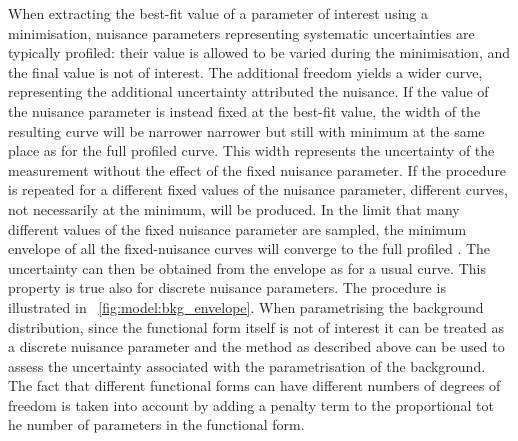 When extracting the best-fit value of a parameter of interest using a \NLL minimisation, nuisance parameters representing systematic uncertainties are typically profiled: their value is allowed to be varied during the minimisation, and the final value is not of interest. The additional freedom yields a wider \NLL curve, representing the additional uncertainty attributed the nuisance. 
If the value of the nuisance parameter is instead fixed at the best-fit value, the width of the resulting \NLL curve will be narrower narrower but still with minimum at the same place as for the full profiled \NLL curve. This width represents the uncertainty of the measurement without the effect of the fixed nuisance parameter. If the procedure is repeated for a different fixed values of the nuisance parameter, different \NLL curves, not necessarily at the minimum, will be produced. In the limit that many different values of the fixed nuisance parameter are sampled, the minimum envelope of all the fixed-nuisance \NLL curves will converge to the full profiled \NLL. The uncertainty can then be obtained from the envelope as for a usual \NLL curve. This property is true also for discrete nuisance parameters. The procedure is illustrated in \Fig~\ref{fig:model:bkg_envelope}. When parametrising the background distribution, since the functional form itself is not of interest it can be treated as a discrete nuisance parameter and the method as described above can be used to assess the uncertainty associated with the parametrisation of the background. The fact that different functional forms can have different numbers of degrees of freedom is taken into account by adding a penalty term to the \NLL proportional tot he number of parameters in the functional form. 

